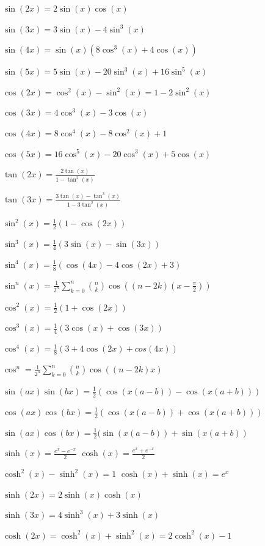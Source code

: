 \documentclass[10pt,a4paper]{scrartcl}
\begin{document}
\begin{multicols*}{3}
	\finn
	
	$\sin(2x)=2\sin(x)\cos(x)$
	
	$\sin(3x)=3\sin(x)-4\sin^3(x)$
	
	$\sin(4x)=\sin(x)(8\cos^3(x)+4\cos(x))$
	
	$\sin(5x)=5\sin(x)-20\sin^3(x)+16\sin^5(x)$
	
	\finn
	
	$\cos(2x)=\cos^2(x)-\sin^2(x)=1-2\sin^2(x)$
	
	$\cos(3x)=4\cos^3(x)-3\cos(x)$
	
	$\cos(4x)=8\cos^4(x)-8\cos^2(x)+1$
	
	$\cos(5x)=16\cos^5(x)-20\cos^3(x)+5\cos(x)$
	
	\finn
	
	$\tan(2x)=\frac{2\tan(x)}{1-\tan^2(x)}$
	
	$\tan(3x)=\frac{3\tan(x)-\tan^3(x)}{1-3\tan^2(x)}$
	
	\finn
	
	$\sin^2(x)=\frac{1}{2}(1-\cos(2x))$
	
	$\sin^3(x)=\frac{1}{4}(3\sin(x)-\sin(3x))$
	
	$\sin^4(x)=\frac{1}{8}(\cos(4x)-4\cos(2x)+3)$

	$\sin^n(x)=\frac{1}{2^n}\sum_{k=0}^n{{n\choose k} \cos((n-2k)(x-\frac{\pi}{2}))}$
	
	\finn
	
	$\cos^2(x)=\frac{1}{2}(1+\cos(2x))$
	
	$\cos^3(x)=\frac{1}{4}(3\cos(x)+\cos(3x))$
	
	$\cos^4(x)=\frac{1}{8}(3+4\cos(2x)+cos(4x))$
	
	$\cos^n=\frac{1}{2^n}\sum_{k=0}^n{{n\choose k}  \cos((n-2k)x)}$
	
	\finn
	
	$\sin(ax)\sin(bx)=\frac{1}{2} (\cos(x(a-b))-\cos(x(a+b)))$
	
	$\cos(ax)\cos(bx)=\frac{1}{2} (\cos(x(a-b))+\cos(x(a+b)))$
	
	$\sin(ax)\cos(bx)=\frac{1}{2} (\sin(x(a-b))+\sin(x(a+b))$
	
	\finn
	
	$\sinh(x)=\frac{e^x-e^{-x}}{2}$ \hfill $\cosh(x)=\frac{e^x+e^{-x}}{2}$
	
	$\cosh^2(x)-\sinh^2(x)=1$ \hfill $\cosh(x)+\sinh(x)=e^x$
	
	$\sinh(2x)=2\sinh(x)\cosh(x)$
	
	$\sinh(3x)=4\sinh^3(x)+3\sinh(x)$
	
	$\cosh(2x)=\cosh^2(x)+\sinh^2(x)=2\cosh^2(x)-1$
	

\end{multicols*}
\end{document}
